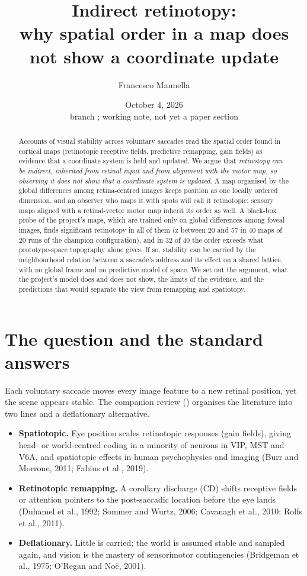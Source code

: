 \documentclass[11pt,a4paper]{article}
\title{Indirect retinotopy:\\why spatial order in a map does not show a coordinate update}
\author{Francesco Mannella}
\date{October 4, 2026 \\ \small branch \code{saliencies}; working note, not yet a paper section}
\newcommand{\code}[1]{\path{#1}}
\begin{document}
\maketitle

\begin{abstract}
\noindent
Accounts of visual stability across voluntary saccades read the spatial order
found in cortical maps (retinotopic receptive fields, predictive remapping, gain
fields) as evidence that a coordinate system is held and updated. We argue that
\emph{retinotopy can be indirect, inherited from retinal input and from alignment
with the motor map, so observing it does not show that a coordinate system is
updated}. A map organised by the global differences among retina-centred images
keeps position as one locally ordered dimension, and an observer who maps it with
spots will call it retinotopic; sensory maps aligned with a retinal-vector motor
map inherit its order as well. A black-box probe of the project's maps, which are
trained only on global differences among foveal images, finds significant
retinotopy in all of them (z between 20 and 57 in 40 maps of 20 runs of the champion
configuration), and in 32 of 40 the order exceeds what prototype-space topography
alone gives. If so, stability can be carried by the
neighbourhood relation between a saccade's address and its effect on a shared
lattice, with no global frame and no predictive model of space. We set out the
argument, what the project's model does and does not show, the limits of the
evidence, and the predictions that would separate the view from remapping and
spatiotopy.
\end{abstract}

\section{The question and the standard answers}

Each voluntary saccade moves every image feature to a new retinal position, yet
the scene appears stable. The companion review
(\code{docs/visual_stability_review.tex}) organises the literature into two lines
and a deflationary alternative.

\begin{itemize}[nosep]
  \item \textbf{Spatiotopic.} Eye position scales retinotopic responses (gain
    fields), giving head- or world-centred coding in a minority of neurons in
    VIP, MST and V6A, and spatiotopic effects in human psychophysics and imaging
    (Burr and Morrone, 2011; Fabius et al., 2019).
  \item \textbf{Retinotopic remapping.} A corollary discharge (CD) shifts
    receptive fields or attention pointers to the post-saccadic location before
    the eye lands (Duhamel et al., 1992; Sommer and Wurtz, 2006; Cavanagh et al.,
    2010; Rolfs et al., 2011).
  \item \textbf{Deflationary.} Little is carried; the world is assumed stable
    and sampled again, and vision is the mastery of sensorimotor contingencies
    (Bridgeman et al., 1975; O'Regan and No\"e, 2001).
\end{itemize}
\end{document}
